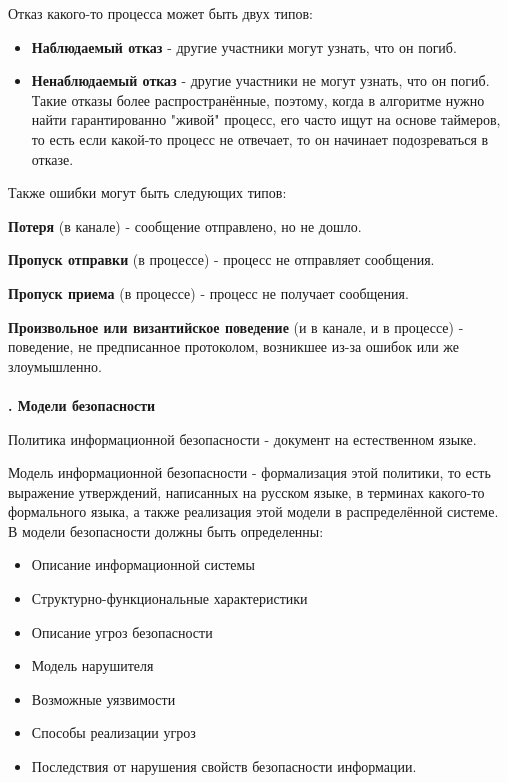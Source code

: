 Отказ какого-то процесса может быть двух типов:
\begin{itemize}
\setlength\itemsep{0.0001em}
\item \textbf{Наблюдаемый отказ}  -  другие участники могут узнать, что он погиб.
\item \textbf{Ненаблюдаемый отказ}  - другие участники не могут узнать, что он погиб. Такие отказы более распространённые, поэтому, когда в алгоритме нужно найти гарантированно "живой" процесс, его часто ищут на основе таймеров, то есть если какой-то процесс не отвечает, то он начинает подозреваться в отказе.
\end{itemize}

\noindent Также ошибки могут быть следующих типов:

\textbf{Потеря} (в канале) - сообщение отправлено, но не дошло. 

\textbf{Пропуск отправки} (в процессе) - процесс не отправляет сообщения.

\textbf{Пропуск приема} (в процессе) - процесс не получает сообщения.

\textbf{Произвольное или византийское поведение} (и в канале, и в процессе) - поведение, не предписанное протоколом, возникшее из-за ошибок или же злоумышленно.\\
\\
\textbf{. Модели безопасности}

Политика информационной безопасности - документ на естественном языке.

Модель информационной безопасности - формализация этой политики, то есть выражение утверждений, написанных на русском языке, в терминах какого-то формального языка, а также реализация этой модели в распределённой системе. \\

В модели безопасности должны быть определенны:
\begin{itemize}
\item Описание информационной системы
\item Структурно-функциональные характеристики
\item Описание угроз безопасности
\item Модель нарушителя
\item Возможные уязвимости
\item Способы реализации угроз
\item Последствия от нарушения свойств безопасности информации.
\end{itemize}




